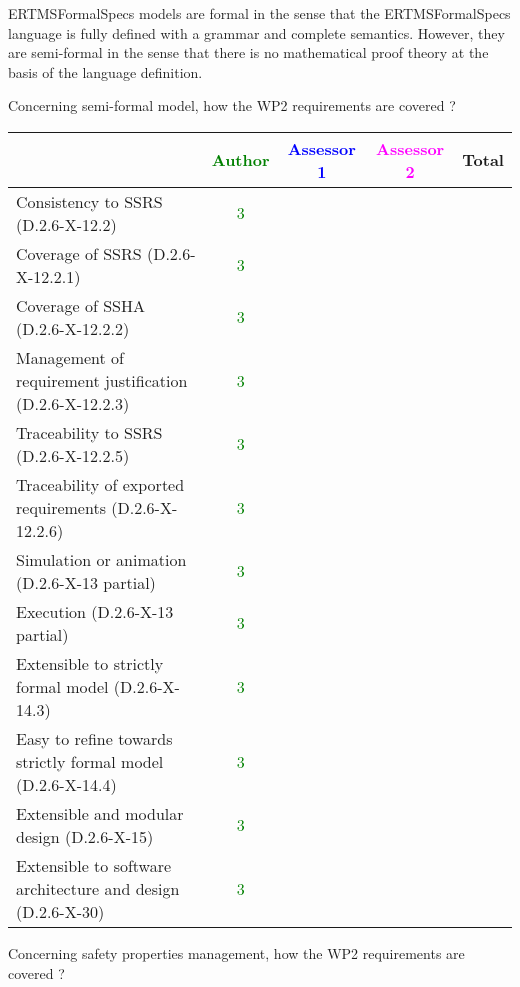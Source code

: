 \begin{author_comment}
\begin{author_comment}
ERTMSFormalSpecs models are formal in the sense that the ERTMSFormalSpecs language is fully defined with a grammar and complete semantics. However, they are semi-formal in the sense that there is no mathematical proof theory at the basis of the language definition.  
\end{author_comment}


Concerning semi-formal model, how the WP2 requirements are covered ?

\begin{tabular}{|l | c | c | c | c|}
\hline
& \textcolor{green}{Author} & \textcolor{blue}{Assessor 1} & \textcolor{magenta}{Assessor 2} & Total \\
\hline 
Consistency to SSRS (D.2.6-X-12.2) & \textcolor{green}{3} & & &  \\
\hline
Coverage of SSRS (D.2.6-X-12.2.1)  & \textcolor{green}{3} & & &  \\
\hline
Coverage of SSHA (D.2.6-X-12.2.2)  & \textcolor{green}{3} & & &  \\
\hline
Management of requirement justification (D.2.6-X-12.2.3)  & \textcolor{green}{3} & & &  \\
\hline
Traceability to  SSRS (D.2.6-X-12.2.5)  & \textcolor{green}{3} & & &  \\
\hline
Traceability of exported requirements (D.2.6-X-12.2.6)  & \textcolor{green}{3} & & &  \\
\hline
Simulation or animation (D.2.6-X-13 partial)  & \textcolor{green}{3} & & &  \\
\hline
Execution (D.2.6-X-13 partial)  & \textcolor{green}{3} & & &  \\
\hline
Extensible to strictly formal model (D.2.6-X-14.3) & \textcolor{green}{3} & & &  \\
\hline
Easy to  refine towards strictly formal model (D.2.6-X-14.4) & \textcolor{green}{3} & & &  \\
\hline
Extensible and modular design (D.2.6-X-15)  & \textcolor{green}{3} & & &  \\
\hline
Extensible to software architecture and design (D.2.6-X-30)   & \textcolor{green}{3} & & &  \\
\hline
\end{tabular}

Concerning safety properties management, how the WP2 requirements are covered ?


\end{author_comment}
